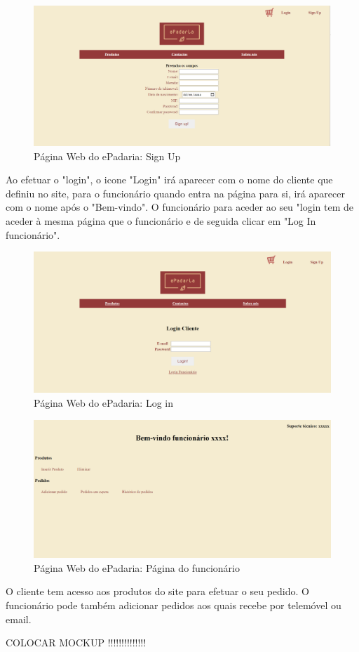 \begin{figure}[H]
	\centering
	\includegraphics[width=15cm]{"mockup sig in"}
	\caption{Página Web do ePadaria: Sign Up}
	\label{fig:mockup-sig-in}
\end{figure}


Ao efetuar o "login", o icone "Login" irá aparecer com o nome do cliente que definiu no site, para o funcionário quando entra na página para si, irá aparecer com o nome após o "Bem-vindo". O funcionário para aceder ao seu "login tem de aceder à mesma página que o funcionário e de seguida clicar em "Log In funcionário".
 
 
\begin{figure}[H]
	\centering
	\includegraphics[width=15cm]{"mockup log in"}
	\caption{Página Web do ePadaria: Log in}
	\label{fig:mockup-log-in}
\end{figure}

\begin{figure}[H]
	\centering
	\includegraphics[width=15cm]{"mockup page func"}
	\caption{Página Web do ePadaria: Página do funcionário}
	\label{fig:mockup-page-func}
\end{figure}


O cliente tem acesso aos produtos do site para efetuar o seu pedido. O funcionário pode também adicionar pedidos aos quais recebe por telemóvel ou email.

COLOCAR MOCKUP !!!!!!!!!!!!!!



